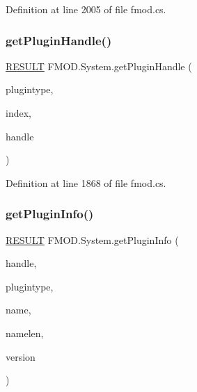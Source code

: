 Definition at line 2005 of file fmod.\+cs.

\mbox{\label{class_f_m_o_d_1_1_system_a8edd8c2fa884aa3a01f0d8d97a4ea7f7}} 
\subsubsection{\texorpdfstring{get\+Plugin\+Handle()}{getPluginHandle()}}
{\footnotesize\ttfamily \hyperlink{namespace_f_m_o_d_a305d1176ef3f8c8815861a60407ac33d}{R\+E\+S\+U\+LT} F\+M\+O\+D.\+System.\+get\+Plugin\+Handle (\begin{DoxyParamCaption}\item[{\hyperlink{namespace_f_m_o_d_ad838bca9e846c3461c840ea9865dfcea}{P\+L\+U\+G\+I\+N\+T\+Y\+PE}}]{plugintype,  }\item[{int}]{index,  }\item[{out uint}]{handle }\end{DoxyParamCaption})}



Definition at line 1868 of file fmod.\+cs.

\mbox{\label{class_f_m_o_d_1_1_system_a8d325e9e080fc76aa8fe84537d696cd3}} 
\subsubsection{\texorpdfstring{get\+Plugin\+Info()}{getPluginInfo()}}
{\footnotesize\ttfamily \hyperlink{namespace_f_m_o_d_a305d1176ef3f8c8815861a60407ac33d}{R\+E\+S\+U\+LT} F\+M\+O\+D.\+System.\+get\+Plugin\+Info (\begin{DoxyParamCaption}\item[{uint}]{handle,  }\item[{out \hyperlink{namespace_f_m_o_d_ad838bca9e846c3461c840ea9865dfcea}{P\+L\+U\+G\+I\+N\+T\+Y\+PE}}]{plugintype,  }\item[{String\+Builder}]{name,  }\item[{int}]{namelen,  }\item[{out uint}]{version }\end{DoxyParamCaption})}



